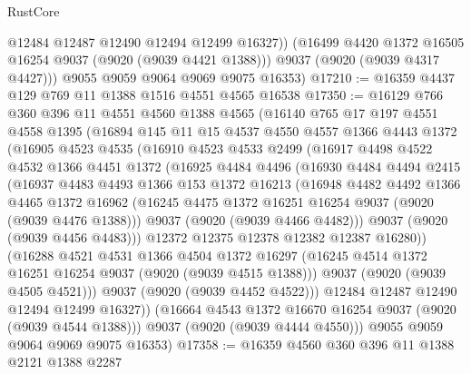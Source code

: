 \begin{lexlean}{RustCore}
\begin{coremodule}
            @12484
            @12487
            @12490
            @12494
            @12499
            @16327))
        (@16499 @4420 @1372 @16505 @16254 @9037 (@9020 (@9039 @4421 @1388)))
        @9037
        (@9020 (@9039 @4317 @4427)))
      @9055
      @9059
      @9064
      @9069
      @9075
      @16353)
@17210 := @16359 @4437 @129 @769 @11 @1388 @1516 @4551 @4565 @16538
@17350 := @16129
    @766
    @360
    @396
    @11
    @4551
    @4560
    @1388
    @4565
    (@16140
      @765
      @17
      @197
      @4551
      @4558
      @1395
      (@16894
        @145
        @11
        @15
        @4537
        @4550
        @4557
        @1366
        @4443
        @1372
        (@16905
          @4523
          @4535
          (@16910
            @4523
            @4533
            @2499
            (@16917
              @4498
              @4522
              @4532
              @1366
              @4451
              @1372
              (@16925
                @4484
                @4496
                (@16930
                  @4484
                  @4494
                  @2415
                  (@16937
                    @4483
                    @4493
                    @1366
                    @153
                    @1372
                    @16213
                    (@16948
                      @4482
                      @4492
                      @1366
                      @4465
                      @1372
                      @16962
                      (@16245 @4475 @1372 @16251 @16254 @9037 (@9020 (@9039 @4476 @1388)))
                      @9037
                      (@9020 (@9039 @4466 @4482)))
                    @9037
                    (@9020 (@9039 @4456 @4483)))
                  @12372
                  @12375
                  @12378
                  @12382
                  @12387
                  @16280))
              (@16288
                @4521
                @4531
                @1366
                @4504
                @1372
                @16297
                (@16245 @4514 @1372 @16251 @16254 @9037 (@9020 (@9039 @4515 @1388)))
                @9037
                (@9020 (@9039 @4505 @4521)))
              @9037
              (@9020 (@9039 @4452 @4522)))
            @12484
            @12487
            @12490
            @12494
            @12499
            @16327))
        (@16664 @4543 @1372 @16670 @16254 @9037 (@9020 (@9039 @4544 @1388)))
        @9037
        (@9020 (@9039 @4444 @4550)))
      @9055
      @9059
      @9064
      @9069
      @9075
      @16353)
@17358 := @16359 @4560 @360 @396 @11 @1388 @2121 @1388 @2287

\end{coremodule}
\end{lexlean}
